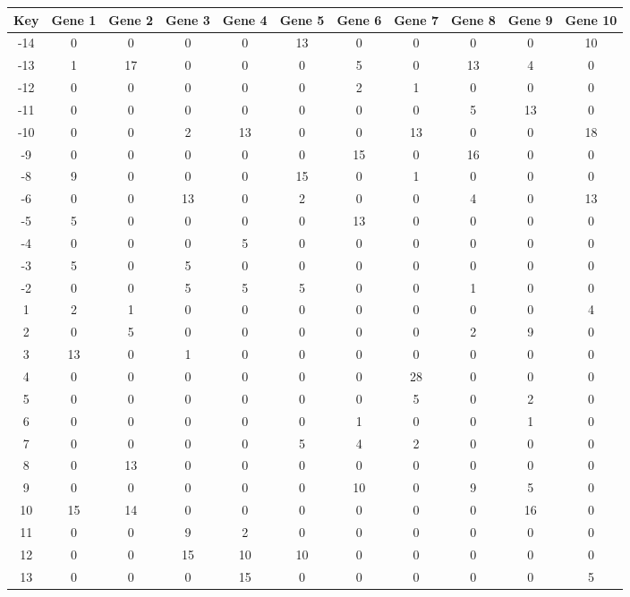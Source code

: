 \begin{tabular}{|c|c|c|c|c|c|c|c|c|c|c|}
\hline
Key & Gene 1 & Gene 2 & Gene 3 & Gene 4 & Gene 5 & Gene 6 & Gene 7 & Gene 8 & Gene 9 & Gene 10 \\
\hline
-14 & 0 & 0 & 0 & 0 & 13 & 0 & 0 & 0 & 0 & 10 \\
-13 & 1 & 17 & 0 & 0 & 0 & 5 & 0 & 13 & 4 & 0 \\
-12 & 0 & 0 & 0 & 0 & 0 & 2 & 1 & 0 & 0 & 0 \\
-11 & 0 & 0 & 0 & 0 & 0 & 0 & 0 & 5 & 13 & 0 \\
-10 & 0 & 0 & 2 & 13 & 0 & 0 & 13 & 0 & 0 & 18 \\
-9 & 0 & 0 & 0 & 0 & 0 & 15 & 0 & 16 & 0 & 0 \\
-8 & 9 & 0 & 0 & 0 & 15 & 0 & 1 & 0 & 0 & 0 \\
-6 & 0 & 0 & 13 & 0 & 2 & 0 & 0 & 4 & 0 & 13 \\
-5 & 5 & 0 & 0 & 0 & 0 & 13 & 0 & 0 & 0 & 0 \\
-4 & 0 & 0 & 0 & 5 & 0 & 0 & 0 & 0 & 0 & 0 \\
-3 & 5 & 0 & 5 & 0 & 0 & 0 & 0 & 0 & 0 & 0 \\
-2 & 0 & 0 & 5 & 5 & 5 & 0 & 0 & 1 & 0 & 0 \\
1 & 2 & 1 & 0 & 0 & 0 & 0 & 0 & 0 & 0 & 4 \\
2 & 0 & 5 & 0 & 0 & 0 & 0 & 0 & 2 & 9 & 0 \\
3 & 13 & 0 & 1 & 0 & 0 & 0 & 0 & 0 & 0 & 0 \\
4 & 0 & 0 & 0 & 0 & 0 & 0 & 28 & 0 & 0 & 0 \\
5 & 0 & 0 & 0 & 0 & 0 & 0 & 5 & 0 & 2 & 0 \\
6 & 0 & 0 & 0 & 0 & 0 & 1 & 0 & 0 & 1 & 0 \\
7 & 0 & 0 & 0 & 0 & 5 & 4 & 2 & 0 & 0 & 0 \\
8 & 0 & 13 & 0 & 0 & 0 & 0 & 0 & 0 & 0 & 0 \\
9 & 0 & 0 & 0 & 0 & 0 & 10 & 0 & 9 & 5 & 0 \\
10 & 15 & 14 & 0 & 0 & 0 & 0 & 0 & 0 & 16 & 0 \\
11 & 0 & 0 & 9 & 2 & 0 & 0 & 0 & 0 & 0 & 0 \\
12 & 0 & 0 & 15 & 10 & 10 & 0 & 0 & 0 & 0 & 0 \\
13 & 0 & 0 & 0 & 15 & 0 & 0 & 0 & 0 & 0 & 5 \\
\hline
\end{tabular}
